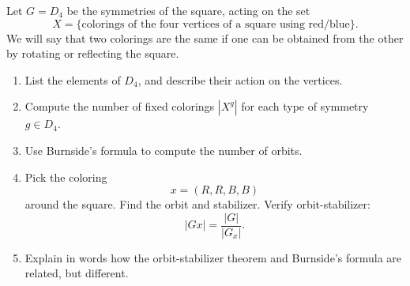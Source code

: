 \begin{prob}
    Let $G = D_4$ be the symmetries of the square, 
    acting on the set 
    \[
        X = \{\text{colorings of the four vertices of a 
        square using red/blue}\}.
    \]
    We will say that two colorings are the same if 
    one can be obtained from the other by rotating 
    or reflecting the square. 

    \begin{enumerate}[label=\alph*)]
        \item List the elements of $D_4$, and describe their 
            action on the vertices. 
        \item Compute the number of fixed colorings 
            $|X^g|$ for each type of symmetry $g \in D_4$.
        \item Use Burnside's formula to compute 
            the number of orbits.
        \item Pick the coloring 
            \[
                x = (R,R,B,B)
            \]
            around the square. Find the orbit and stabilizer.
            Verify orbit-stabilizer: 
            \[
                |Gx| = \frac{|G|}{|G_x|}. 
            \]
        \item Explain in words how the orbit-stabilizer theorem 
            and Burnside's formula are related, but different.
    \end{enumerate}
\end{prob}

